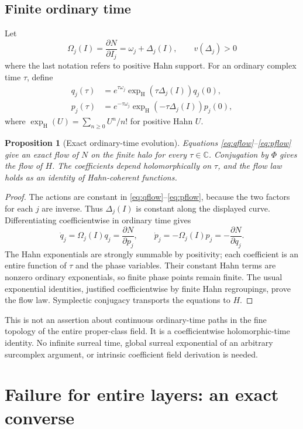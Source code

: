 \documentclass[11pt,letterpaper]{article}
\numberwithin{equation}{section}
\newtheorem{proposition}[theorem]{Proposition}
\theoremstyle{definition}
\theoremstyle{remark}
\newcommand{\C}{\mathbb C}
\begin{document}
\subsection{Finite ordinary time}
Let
\[
 \Omega_j(I)=\frac{\partial N}{\partial I_j}
            =\omega_j+\Delta_j(I),\qquad v(\Delta_j)>0
\]
where the last notation refers to positive Hahn support. For an ordinary
complex time $\tau$, define
\begin{align}
 q_j(\tau)&=e^{\tau\omega_j}
       \exp_{\mathrm H}(\tau\Delta_j(I))q_j(0),\label{eq:qflow}\\
 p_j(\tau)&=e^{-\tau\omega_j}
       \exp_{\mathrm H}(-\tau\Delta_j(I))p_j(0),\label{eq:pflow}
\end{align}
where $\exp_{\mathrm H}(U)=\sum_{n\ge0}U^n/n!$ for positive Hahn $U$.

\begin{proposition}[Exact ordinary-time evolution]\label{prop:flow}
Equations \eqref{eq:qflow}--\eqref{eq:pflow} give an exact flow of $N$ on the
finite halo for every $\tau\in\C$. Conjugation by $\Phi$ gives the flow of
$H$. The coefficients depend holomorphically on $\tau$, and the flow law
holds as an identity of Hahn-coherent functions.
\end{proposition}
\begin{proof}
The actions are constant in \eqref{eq:qflow}--\eqref{eq:pflow}, because the
two factors for each $j$ are inverse. Thus $\Delta_j(I)$ is constant along
the displayed curve. Differentiating coefficientwise in ordinary time gives
\[
 \dot q_j=\Omega_j(I)q_j=\frac{\partial N}{\partial p_j},\qquad
 \dot p_j=-\Omega_j(I)p_j=-\frac{\partial N}{\partial q_j}.
\]
The Hahn exponentials are strongly summable by positivity; each coefficient
is an entire function of $\tau$ and the phase variables. Their constant
Hahn terms are nonzero ordinary exponentials, so finite phase points remain
finite. The usual exponential identities, justified coefficientwise by
finite Hahn regroupings, prove the flow law. Symplectic conjugacy transports
the equations to $H$.
\end{proof}
This is not an assertion about continuous ordinary-time paths in the fine
topology of the entire proper-class field. It is a coefficientwise
holomorphic-time identity. No infinite surreal time, global surreal
exponential of an arbitrary surcomplex argument, or intrinsic coefficient
field derivation is needed.

\section{Failure for entire layers: an exact converse}
\label{sec:counterexample}
\end{document}
